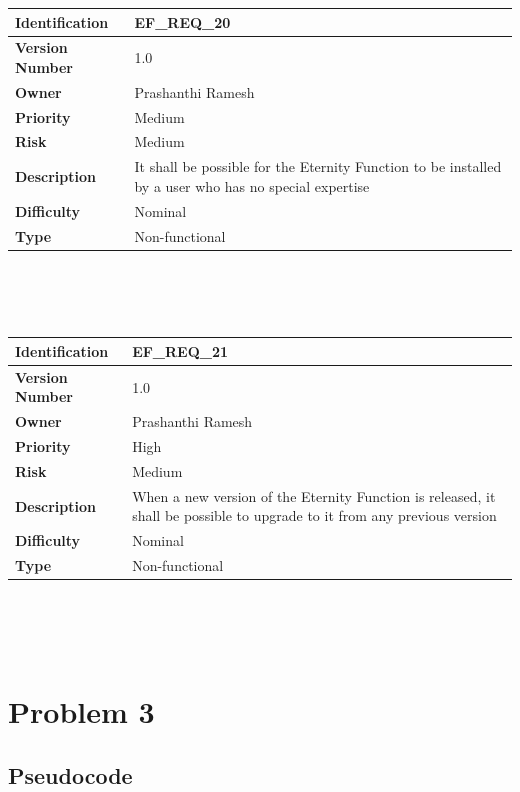 \documentclass[11pt, english]{report}
\begin{document}
\setlength{\tabcolsep}{18pt}
\renewcommand{\arraystretch}{1.5}
\begin{tabular}{ |p{2.2cm}|p{9.8cm}| }
\hline
\textbf{Identification} &  EF\_REQ\_20 \\ \hline 
\textbf{Version Number} & 1.0 \\ \hline 
\textbf{Owner} & Prashanthi Ramesh  \\ \hline
\textbf{Priority} & Medium  \\ \hline
\textbf{Risk} & Medium  \\ \hline
\textbf{Description} & It shall be possible for the Eternity Function to be installed by a user who has no special expertise \\ \hline
\textbf{Difficulty} & Nominal  \\ \hline
\textbf{Type} & Non-functional\\ 
\hline
\end{tabular} \\ \\ \\ 

\setlength{\tabcolsep}{18pt}
\renewcommand{\arraystretch}{1.5}
\begin{tabular}{ |p{2.2cm}|p{9.8cm}| }
\hline
\textbf{Identification} &  EF\_REQ\_21 \\ \hline 
\textbf{Version Number} & 1.0 \\ \hline 
\textbf{Owner} & Prashanthi Ramesh  \\ \hline
\textbf{Priority} & High  \\ \hline
\textbf{Risk} & Medium  \\ \hline
\textbf{Description} & When a new version of the Eternity Function is released, it shall be possible to upgrade to it from any previous version \\ \hline
\textbf{Difficulty} & Nominal  \\ \hline
\textbf{Type} & Non-functional\\ 
\hline
\end{tabular} \\ \\ \\ 


\chapter{Problem 3}

\section{Pseudocode}
\end{document}
